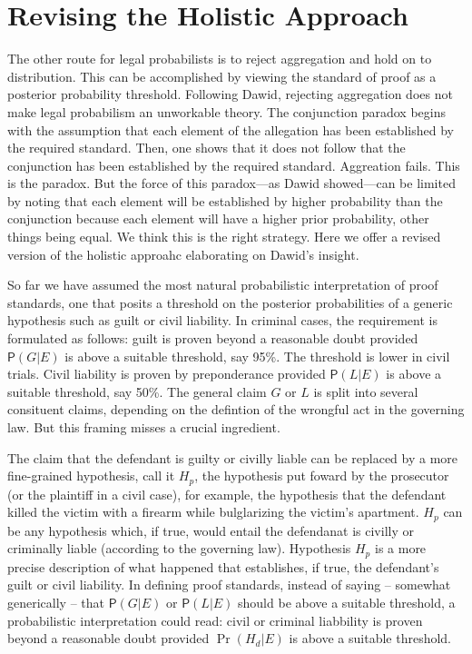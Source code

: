 \documentclass[10pt,dvipsnames,enabledeprecatedfontcommands]{scrartcl}
\newcommand{\pr}[1]{\mathsf{P}(#1)}
\begin{document}
\hypertarget{revising-the-holistic-approach}{%
\section{Revising the Holistic
Approach}\label{revising-the-holistic-approach}}

The other route for legal probabilists is to reject aggregation and hold
on to distribution. This can be accomplished by viewing the standard of
proof as a posterior probability threshold. Following Dawid, rejecting
aggregation does not make legal probabilism an unworkable theory. The
conjunction paradox begins with the assumption that each element of the
allegation has been established by the required standard. Then, one
shows that it does not follow that the conjunction has been established
by the required standard. Aggreation fails. This is the paradox. But the
force of this paradox---as Dawid showed---can be limited by noting that
each element will be established by higher probability than the
conjunction because each element will have a higher prior probability,
other things being equal. We think this is the right strategy. Here we
offer a revised version of the holistic approahc elaborating on Dawid's
insight.

So far we have assumed the most natural probabilistic interpretation of
proof standards, one that posits a threshold on the posterior
probabilities of a generic hypothesis such as guilt or civil liability.
In criminal cases, the requirement is formulated as follows: guilt is
proven beyond a reasonable doubt provided \(\pr{G | E}\) is above a
suitable threshold, say 95\%. The threshold is lower in civil trials.
Civil liability is proven by preponderance provided \(\pr{L | E}\) is
above a suitable threshold, say 50\%. The general claim \(G\) or \(L\)
is split into several consituent claims, depending on the defintion of
the wrongful act in the governing law. But this framing misses a crucial
ingredient.

The claim that the defendant is guilty or civilly liable can be replaced
by a more fine-grained hypothesis, call it \(H_p\), the hypothesis put
foward by the prosecutor (or the plaintiff in a civil case), for
example, the hypothesis that the defendant killed the victim with a
firearm while bulglarizing the victim's apartment. \(H_p\) can be any
hypothesis which, if true, would entail the defendanat is civilly or
criminally liable (according to the governing law). Hypothesis \(H_p\)
is a more precise description of what happened that establishes, if
true, the defendant's guilt or civil liability. In defining proof
standards, instead of saying -- somewhat generically -- that
\(\pr{G | E}\) or \(\pr{L | E}\) should be above a suitable threshold, a
probabilistic interpretation could read: civil or criminal liabbility is
proven beyond a reasonable doubt provided \(\Pr(H_d | E)\) is above a
suitable threshold.
\end{document}
